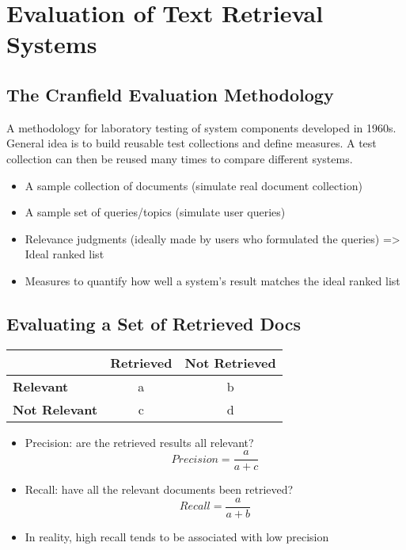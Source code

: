 \newpage
\section{Evaluation of Text Retrieval Systems}

\subsection{The Cranfield Evaluation Methodology}

A methodology for laboratory testing of system components developed in 1960s. General idea is to build reusable test collections and define measures. A test collection can then be reused many times to compare different systems.
\begin{itemize}
\item A sample collection of documents (simulate real document collection)
\item A sample set of queries/topics (simulate user queries)
\item Relevance judgments (ideally made by users who formulated the queries) => Ideal ranked list
\item  Measures to quantify how well a system’s result matches the ideal ranked list
\end{itemize}


\subsection{Evaluating a Set of Retrieved Docs}

\begin{center}
  \begin{tabular}{ | l | c | c | }
    \hline
    & \textbf{Retrieved} & \textbf{Not Retrieved} \\    
    \hline    
    \textbf{Relevant}     & a & b \\ 
    \textbf{Not Relevant} & c & d \\
    \hline  
  \end{tabular}
\end{center}

\begin{itemize}
\item Precision: are the retrieved results all relevant?
\begin{equation*}
Precision = \frac{a}{a+c}
\end{equation*}
\item Recall: have all the relevant documents been retrieved?
\begin{equation*}
Recall = \frac{a}{a+b}
\end{equation*}
\item In reality, high recall tends to be associated with low precision
\end{itemize}


